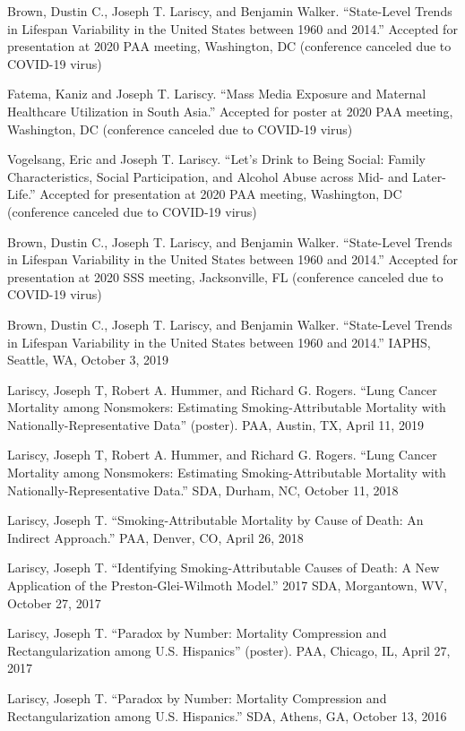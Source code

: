 \documentclass[11pt,]{article}
\begin{document}
Brown, Dustin C., Joseph T. Lariscy, and Benjamin Walker. ``State-Level
Trends in Lifespan Variability in the United States between 1960 and
2014.'' Accepted for presentation at 2020 PAA meeting, Washington, DC
(conference canceled due to COVID-19 virus)

Fatema, Kaniz and Joseph T. Lariscy. ``Mass Media Exposure and Maternal
Healthcare Utilization in South Asia.'' Accepted for poster at 2020 PAA
meeting, Washington, DC (conference canceled due to COVID-19 virus)

Vogelsang, Eric and Joseph T. Lariscy. ``Let's Drink to Being Social:
Family Characteristics, Social Participation, and Alcohol Abuse across
Mid- and Later-Life.'' Accepted for presentation at 2020 PAA meeting,
Washington, DC (conference canceled due to COVID-19 virus)

Brown, Dustin C., Joseph T. Lariscy, and Benjamin Walker. ``State-Level
Trends in Lifespan Variability in the United States between 1960 and
2014.'' Accepted for presentation at 2020 SSS meeting, Jacksonville, FL
(conference canceled due to COVID-19 virus)

Brown, Dustin C., Joseph T. Lariscy, and Benjamin Walker. ``State-Level
Trends in Lifespan Variability in the United States between 1960 and
2014.'' IAPHS, Seattle, WA, October 3, 2019

Lariscy, Joseph T, Robert A. Hummer, and Richard G. Rogers. ``Lung
Cancer Mortality among Nonsmokers: Estimating Smoking-Attributable
Mortality with Nationally-Representative Data'' (poster). PAA, Austin,
TX, April 11, 2019

Lariscy, Joseph T, Robert A. Hummer, and Richard G. Rogers. ``Lung
Cancer Mortality among Nonsmokers: Estimating Smoking-Attributable
Mortality with Nationally-Representative Data.'' SDA, Durham, NC,
October 11, 2018

Lariscy, Joseph T. ``Smoking-Attributable Mortality by Cause of Death:
An Indirect Approach.'' PAA, Denver, CO, April 26, 2018

Lariscy, Joseph T. ``Identifying Smoking-Attributable Causes of Death: A
New Application of the Preston-Glei-Wilmoth Model.'' 2017 SDA,
Morgantown, WV, October 27, 2017

Lariscy, Joseph T. ``Paradox by Number: Mortality Compression and
Rectangularization among U.S. Hispanics'' (poster). PAA, Chicago, IL,
April 27, 2017

Lariscy, Joseph T. ``Paradox by Number: Mortality Compression and
Rectangularization among U.S. Hispanics.'' SDA, Athens, GA, October 13,
2016
\end{document}
